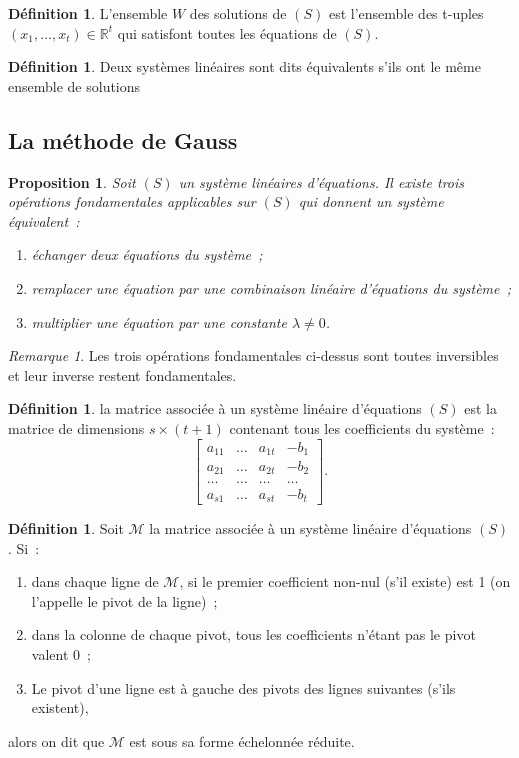 \documentclass{article}
\newcommand{\R}{\mathbb R}
\newtheorem{prp}[thm]{Proposition}
\theoremstyle{definition}
\newtheorem{déf}[thm]{Définition}
\theoremstyle{remark}
\newtheorem*{rmq}{Remarque}
\begin{document}
		\begin{déf} L'ensemble $W$ des solutions de $(S)$ est l'ensemble des t-uples $(x_1, \dotsc, x_t) \in \R^t$ qui satisfont toutes les équations de $(S)$. \end{déf}

		\begin{déf} Deux systèmes linéaires sont dits équivalents s'ils ont le même ensemble de solutions \end{déf}

	\subsection{La méthode de Gauss}
		\begin{prp}\label{opérationsFondamentalesGauss}
		Soit $(S)$ un système linéaires d'équations. Il existe trois opérations fondamentales applicables sur $(S)$ qui donnent un système équivalent~:
		\begin{enumerate}
			\item échanger deux équations du système~;
			\item remplacer une équation par une combinaison linéaire d'équations du système~;
			\item multiplier une équation par une constante $\lambda \neq 0$.
		\end{enumerate}
		\end{prp}

		\begin{rmq} Les trois opérations fondamentales ci-dessus sont toutes inversibles et leur inverse restent fondamentales. \end{rmq}

		\begin{déf} la matrice associée à un système linéaire d'équations $(S)$ est la matrice de dimensions $s \times (t+1)$ contenant tous les coefficients du système~:
		\[\begin{bmatrix}a_{11} & \ldots & a_{1t} & -b_1 \\
		                 a_{21} & \ldots & a_{2t} & -b_2 \\
										 \ldots & \ldots & \ldots & \ldots \\
										 a_{s1} & \ldots & a_{st} & -b_t
			\end{bmatrix}.\]
		\end{déf}

		\begin{déf} Soit $\mathcal M$ la matrice associée à un système linéaire d'équations $(S)$. Si~:
		\begin{enumerate}
			\item dans chaque ligne de $\mathcal M$, si le premier coefficient non-nul (s'il existe) est 1 (on l'appelle le pivot de la ligne)~;
			\item dans la colonne de chaque pivot, tous les coefficients n'étant pas le pivot valent 0~;
			\item Le pivot d'une ligne est à gauche des pivots des lignes suivantes (s'ils existent),
		\end{enumerate}
		alors on dit que $\mathcal M$ est sous sa forme échelonnée réduite.
		\end{déf}
\end{document}
